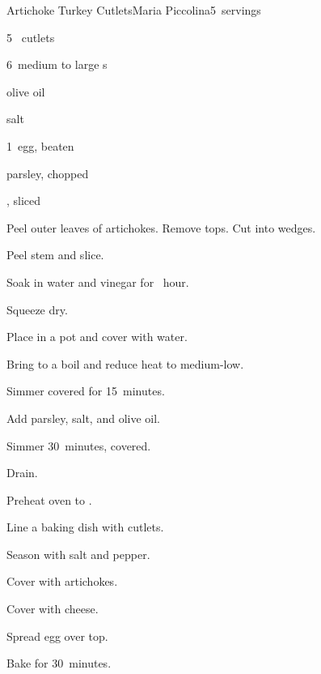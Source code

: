 \begin{recipe}{Artichoke Turkey Cutlets}{Maria Piccolina}{5~servings}

\begin{ingredients}
\item 5~ cutlets
\item 6~medium to large s
\item \Tp{2\half} olive oil
\item salt
\item 1~egg, beaten
\item parsley, chopped
\item {}, sliced
\end{ingredients}

\begin{directions}
\item Peel outer leaves of artichokes. Remove tops. Cut into wedges.
\item Peel stem and slice.
\item Soak in water and vinegar for \half~hour.
\item Squeeze dry.
\item Place in a pot and cover with water.
\item Bring to a boil and reduce heat to medium-low.
\item Simmer covered for 15~minutes.
\item Add parsley, salt, and olive oil.
\item Simmer 30~minutes, covered.
\item Drain.
\item Preheat oven to .
\item Line a baking dish with cutlets.
\item Season with salt and pepper.
\item Cover with artichokes.
\item Cover with cheese.
\item Spread egg over top.
\item Bake for 30~minutes.
\end{directions}

\end{recipe}
